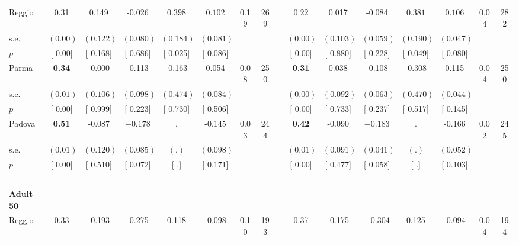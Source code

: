 \begin{longtable}{L{8em} c c c c c c c p{1em} c c c c c c c}
\quad \quad \quad Reggio& 0.31 &     0.149 &    -0.026 & $ \mathbf{    0.398}$ & $ \mathbf{    0.102}$ &      0.19 &       269 & & 0.22 &     0.017 &    -0.084 & $ \mathbf{    0.381}$ & $ \mathbf{    0.106}$ &      0.04 &       282  \\*
\quad \quad \quad \quad s.e.& $ (     0.00)$ & $ (    0.122)$ & $ (    0.080)$ & $ (    0.184)$ & $ (    0.081)$ & & & & $ (     0.00)$ & $ (    0.103)$ & $ (    0.059)$ & $ (    0.190)$ & $ (    0.047)$ & &  \\*
\quad \quad \quad \quad $ p$ & [     0.00] & [    0.168] & [    0.686] & [    0.025] & [    0.086] & & & & [     0.00] & [    0.880] & [    0.228] & [    0.049] & [    0.080] & &  \\[1em]
\quad \quad \quad Parma& \textbf{     0.34} &    -0.000 &    -0.113 &    -0.163 &     0.054 &      0.08 &       250 & & \textbf{     0.31} &     0.038 &    -0.108 &    -0.308 &     0.115 &      0.04 &       250  \\*
\quad \quad \quad \quad s.e.& $ (     0.01)$ & $ (    0.106)$ & $ (    0.098)$ & $ (    0.474)$ & $ (    0.084)$ & & & & $ (     0.00)$ & $ (    0.092)$ & $ (    0.063)$ & $ (    0.470)$ & $ (    0.044)$ & &  \\*
\quad \quad \quad \quad $ p$ & [     0.00] & [    0.999] & [    0.223] & [    0.730] & [    0.506] & & & & [     0.00] & [    0.733] & [    0.237] & [    0.517] & [    0.145] & &  \\[1em]
\quad \quad \quad Padova& \textbf{     0.51} &    -0.087 & $ \mathbf{   -0.178}$ &         . &    -0.145 &      0.03 &       244 & & \textbf{     0.42} &    -0.090 & $ \mathbf{   -0.183}$ &         . &    -0.166 &      0.02 &       245  \\*
\quad \quad \quad \quad s.e.& $ (     0.01)$ & $ (    0.120)$ & $ (    0.085)$ & $ (        .)$ & $ (    0.098)$ & & & & $ (     0.01)$ & $ (    0.091)$ & $ (    0.041)$ & $ (        .)$ & $ (    0.052)$ & &  \\*
\quad \quad \quad \quad $ p$ & [     0.00] & [    0.510] & [    0.072] & [        .] & [    0.171] & & & & [     0.00] & [    0.477] & [    0.058] & [        .] & [    0.103] & &  \\[1em]
~\\[1em]
\quad \quad \textbf{Adult 50} & & & & & & & & & & & & & & & \\* 
\quad \quad \quad Reggio& 0.33 &    -0.193 &    -0.275 &     0.118 &    -0.098 &      0.10 &       193 & & 0.37 &    -0.175 & $ \mathbf{   -0.304}$ &     0.125 &    -0.094 &      0.04 &       194  \\*

\end{longtable}
